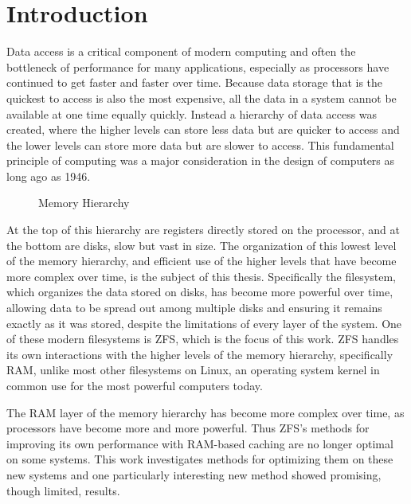 \chapter{Introduction}
Data access is a critical component of modern computing and often the bottleneck of performance for many applications,
especially as processors have continued to get faster and faster over time.
Because data storage that is the quickest to access is also the most expensive, 
all the data in a system cannot be available at one time equally quickly.
Instead a hierarchy of data access was created, where the higher levels can store less data but are quicker to access and the
lower levels can store more data but are slower to access.
This fundamental principle of computing was a major consideration in the design of
computers as long ago as 1946\cite{burks_preliminary_1946}.

\begin{figure}[H]
    \centering
    \resizebox{0.5\linewidth}{!}{}
    \captionsetup{width=0.5\linewidth}
    \caption{Memory Hierarchy}
    \label{fig:memoryhierarchy}
\end{figure}

At the top of this hierarchy are registers directly stored on the processor, and at the bottom are disks,
slow but vast in size.
The organization of this lowest level of the memory hierarchy, and efficient use of the higher levels that have become more
complex over time,
is the subject of this thesis.
Specifically the filesystem, which organizes the data stored on disks, has become more powerful over time, allowing
data to be spread out among multiple disks and ensuring it remains exactly as it was stored, despite the limitations
of every layer of the system.
One of these modern filesystems is ZFS, which is the focus of this work.
ZFS handles its own interactions with the higher levels of the memory hierarchy, specifically RAM,
unlike most other filesystems on Linux, an operating system kernel in common use for the most powerful computers today.

The RAM layer of the memory hierarchy has become more complex over time, as processors have become more and more powerful.
Thus ZFS's methods for improving its own performance with RAM-based caching are no longer optimal on some systems.
This work investigates methods for optimizing them on these new systems and one particularly interesting new method showed
promising, though limited, results.

